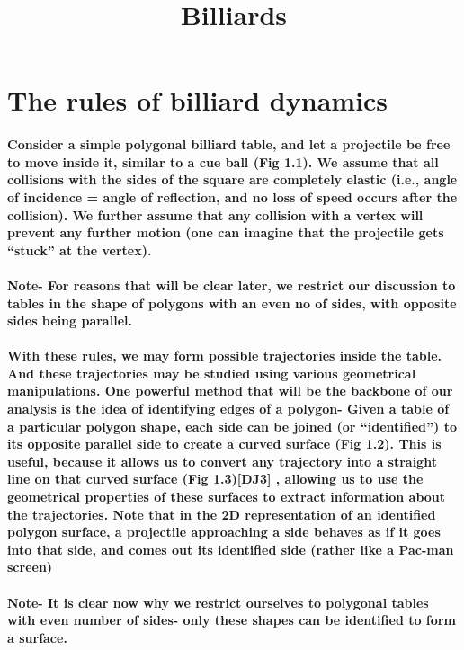 \documentclass{article}
\title{Billiards}
\begin{document}
\maketitle

\section{The rules of billiard dynamics}
\paragraph{Consider a simple polygonal billiard table, and let a projectile be free to move inside it, similar to a cue ball (Fig 1.1). We assume that all collisions with the sides of the square are completely elastic (i.e., angle of incidence = angle of reflection, and no loss of speed occurs after the collision). We further assume that any collision with a vertex will prevent any further motion (one can imagine that the projectile gets “stuck” at the vertex).}


\paragraph{Note- For reasons that will be clear later, we restrict our discussion to tables in the shape of polygons with an even no of sides, with opposite sides being parallel.}
 
\paragraph{With these rules, we may form possible trajectories inside the table. And these trajectories may be studied using various geometrical manipulations. One powerful method that will be the backbone of our analysis is the idea of identifying edges of a polygon- Given a table of a particular polygon shape, each side can be joined (or “identified”) to its opposite parallel side to create a curved surface (Fig 1.2). This is useful, because it allows us to convert any trajectory into a straight line on that curved surface (Fig 1.3)[DJ3] , allowing us to use the geometrical properties of these surfaces to extract information about the trajectories. Note that in the 2D representation of an identified polygon surface, a projectile approaching a side behaves as if it goes into that side, and comes out its identified side (rather like a Pac-man screen)}

\paragraph{Note- It is clear now why we restrict ourselves to polygonal tables with even number of sides- only these shapes can be identified to form a surface.}
\end{document}

